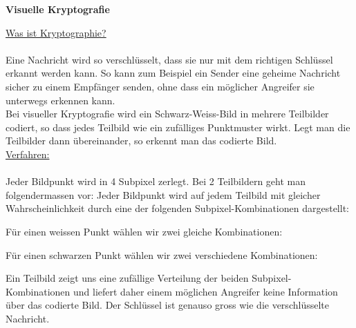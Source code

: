 \documentclass[12pt]{article}
\begin{document}
   \pagestyle{empty}
   \parindent0cm
    

   \begin{center}
     {\Large \bf Visuelle Kryptografie} \\
    

  \end{center}
   \vspace{0.5cm}
   \normalsize
   \parindent0cm

   
\underline{Was ist Kryptographie?}\\
\\
Eine Nachricht wird so verschl\"usselt, dass sie nur mit dem richtigen Schl\"ussel erkannt werden kann.
So kann zum Beispiel ein Sender eine geheime Nachricht sicher zu einem Empf\"anger senden, ohne dass ein
m\"oglicher Angreifer sie unterwegs erkennen kann.\\

\vspace{2.5cm}
Bei visueller Kryptografie wird ein Schwarz-Weiss-Bild in mehrere Teilbilder codiert, so dass jedes 
Teilbild wie ein zuf\"alliges Punktmuster wirkt. Legt man die Teilbilder dann \"ubereinander, so erkennt 
man das codierte Bild.\\

\vspace{0.5cm}
\underline{Verfahren:}\\
\\
Jeder Bildpunkt wird in 4 Subpixel zerlegt. Bei 2 Teilbildern geht man folgendermassen vor: Jeder 
Bildpunkt wird auf jedem Teilbild mit gleicher Wahrscheinlichkeit durch eine der folgenden Subpixel-Kombinationen 
dargestellt:\\

\vspace{3.5cm}

F\"ur einen weissen Punkt w\"ahlen wir zwei gleiche Kombinationen:

\vspace{3.5cm}

F\"ur einen schwarzen Punkt w\"ahlen wir zwei verschiedene Kombinationen:

\vspace{3.5cm}

Ein Teilbild zeigt uns eine zuf\"allige Verteilung der beiden Subpixel-Kombinationen und liefert daher einem 
m\"oglichen Angreifer keine Information \"uber das codierte Bild. Der Schl\"ussel ist genauso gross wie die verschl\"usselte
Nachricht.\\
\end{document}
